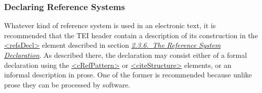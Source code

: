 \subsubsection[{Declaring Reference Systems}]{Declaring Reference Systems}\label{CORS6}\par
Whatever kind of reference system is used in an electronic text, it is recommended that the TEI header contain a description of its construction in the \hyperref[TEI.refsDecl]{<refsDecl>} element described in section \textit{\hyperref[HD54]{2.3.6.\ The Reference System Declaration}}. As described there, the declaration may consist either of a formal declaration using the \hyperref[TEI.cRefPattern]{<cRefPattern>} or \hyperref[TEI.citeStructure]{<citeStructure>} elements, or an informal description in prose. One of the former is recommended because unlike prose they can be processed by software.\par
